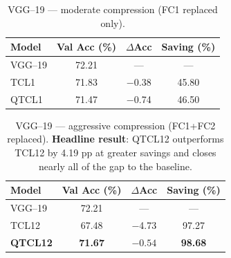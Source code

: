 \begin{table}[t]
\centering
\small
\caption{VGG--19 --- moderate compression (FC1 replaced only).}
\label{tab:vgg_moderate}
\setlength{\tabcolsep}{5pt}
\renewcommand{\arraystretch}{1.15}
\begin{tabular}{lccc}
\toprule
\textbf{Model} & \textbf{Val Acc (\%)} & \textbf{$\Delta$Acc} & \textbf{Saving (\%)} \\
\midrule
VGG--19               & 72.21 & ---              & ---   \\
TCL1                  & 71.83 & $-$0.38          & 45.80 \\
QTCL1                 & 71.47 & $-$0.74          & 46.50 \\
\bottomrule
\end{tabular}
\end{table}

\begin{table}[t]
\centering
\small
\caption{VGG--19 --- aggressive compression (FC1+FC2 replaced). \textbf{Headline result}: QTCL12 outperforms TCL12 by 4.19 pp at greater savings and closes nearly all of the gap to the baseline.}
\label{tab:vgg_aggressive}
\setlength{\tabcolsep}{5pt}
\renewcommand{\arraystretch}{1.15}
\begin{tabular}{lccc}
\toprule
\textbf{Model} & \textbf{Val Acc (\%)} & \textbf{$\Delta$Acc} & \textbf{Saving (\%)} \\
\midrule
VGG--19                         & 72.21 & ---              & ---   \\
TCL12                           & 67.48 & $-$4.73          & 97.27 \\
\textbf{QTCL12}      & \textbf{71.67} & $\mathbf{-0.54}$ & \textbf{98.68} \\
\bottomrule
\end{tabular}
\end{table}